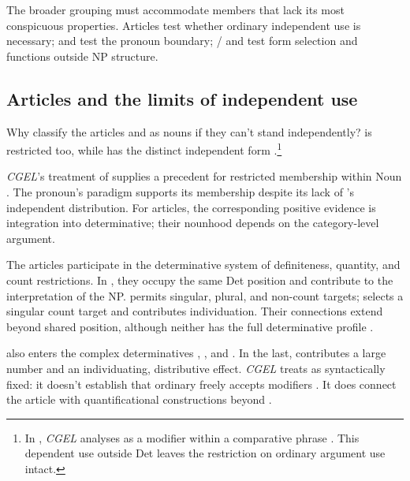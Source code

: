 \documentclass[12pt]{article}
\begin{document}
The broader grouping must accommodate members that lack its most conspicuous properties. Articles test whether ordinary independent use is necessary;  and  test the pronoun boundary; / and  test form selection and functions outside NP structure.

\subsection{Articles and the limits of independent use}

Why classify the articles  and  as nouns if they can't stand independently?  is restricted too, while  has the distinct independent form  \citep[371--372, 410--411]{huddleston2002}.\footnote{In , \textit{CGEL} analyses  as a modifier within a comparative phrase \citep[1131--1132, 1135--1136]{huddleston2002}. This dependent use outside Det leaves the restriction on ordinary argument use intact.}

\textit{CGEL}'s treatment of  supplies a precedent for restricted membership within Noun \citep[470--471]{huddleston2002}. The pronoun's paradigm supports its membership despite its lack of 's independent distribution. For articles, the corresponding positive evidence is integration into determinative; their nounhood depends on the category-level argument.

The articles participate in the determinative system of definiteness, quantity, and count restrictions. In , they occupy the same Det position and contribute to the interpretation of the NP.  permits singular, plural, and non-count targets;  selects a singular count target and contributes individuation. Their connections extend beyond shared position, although neither has the full determinative profile \citep[368--373]{huddleston2002}.

 also enters the complex determinatives , , and . In the last,  contributes a large number and  an individuating, distributive effect. \textit{CGEL} treats  as syntactically fixed: it doesn't establish that ordinary  freely accepts modifiers \citep[392--394]{huddleston2002}. It does connect the article with quantificational constructions beyond .
\end{document}
